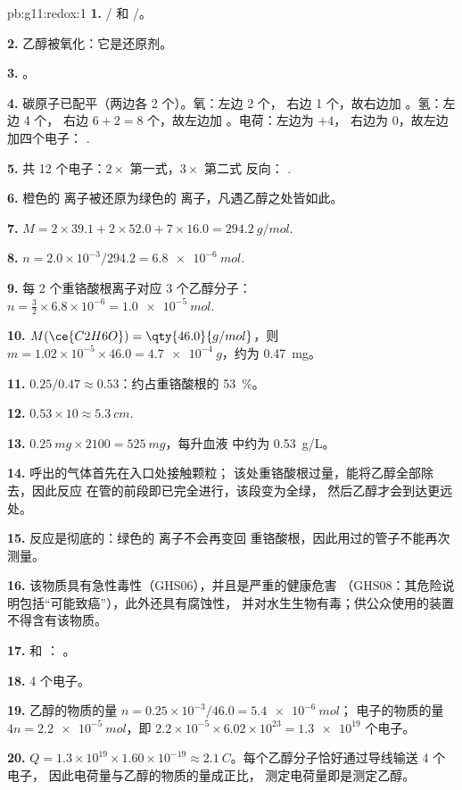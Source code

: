 \begin{solution}{pb:g11:redox:1}
\textbf{1.} / 和 /。

\textbf{2.} 乙醇被氧化：它是还原剂。

\textbf{3.} 。

\textbf{4.} 碳原子已配平（两边各 2 个）。氧：左边 2 个，
右边 1 个，故右边加 。氢：左边 4 个，
右边 $6 + 2 = 8$ 个，故左边加 。电荷：左边为 $+4$，
右边为 0，故左边加四个电子：
.

\textbf{5.} 共 12 个电子：$2\times$ 第一式，$3\times$ 第二式
反向：
.

\textbf{6.} 橙色的  离子被还原为绿色的
 离子，凡遇乙醇之处皆如此。

\textbf{7.} $M = 2\times 39.1 + 2\times 52.0 + 7\times 16.0 =
\qty{294.2}{g/mol}$.

\textbf{8.} $n = 2.0\times 10^{-3}/294.2 = \qty{6.8e-6}{mol}$.

\textbf{9.} 每 2 个重铬酸根离子对应 3 个乙醇分子：
$n = \tfrac{3}{2}\times 6.8\times 10^{-6} = \qty{1.0e-5}{mol}$.

\textbf{10.} $M(\ce{C2H6O}) = \qty{46.0}{g/mol}$，则
$m = 1.02\times 10^{-5}\times 46.0 = \qty{4.7e-4}{g}$，约为
\qty{0.47}{mg}。

\textbf{11.} $0.25/0.47 \approx 0.53$：约占重铬酸根的
\qty{53}{\percent}。

\textbf{12.} $0.53 \times 10 \approx \qty{5.3}{cm}$.

\textbf{13.} $\qty{0.25}{mg} \times 2100 = \qty{525}{mg}$，每升血液
中约为 \qty{0.53}{g/L}。

\textbf{14.} 呼出的气体首先在入口处接触颗粒；
该处重铬酸根过量，能将乙醇全部除去，因此反应
在管的前段即已完全进行，该段变为全绿，
然后乙醇才会到达更远处。

\textbf{15.} 反应是彻底的：绿色的  离子不会再变回
重铬酸根，因此用过的管子不能再次测量。

\textbf{16.} 该物质具有急性毒性（GHS06），并且是严重的健康危害
（GHS08：其危险说明包括“可能致癌”），此外还具有腐蚀性，
并对水生生物有毒；供公众使用的装置
不得含有该物质。

\textbf{17.}  和
：
。

\textbf{18.} 4 个电子。

\textbf{19.} 乙醇的物质的量 $n = 0.25\times 10^{-3}/46.0 = \qty{5.4e-6}{mol}$；
电子的物质的量 $4n = \qty{2.2e-5}{mol}$，即
$2.2\times 10^{-5}\times 6.02\times 10^{23} = \num{1.3e19}$ 个电子。

\textbf{20.} $Q = 1.3\times 10^{19}\times 1.60\times 10^{-19} \approx
\qty{2.1}{C}$。每个乙醇分子恰好通过导线输送 4 个电子，
因此电荷量与乙醇的物质的量成正比，
测定电荷量即是测定乙醇。
\end{solution}
